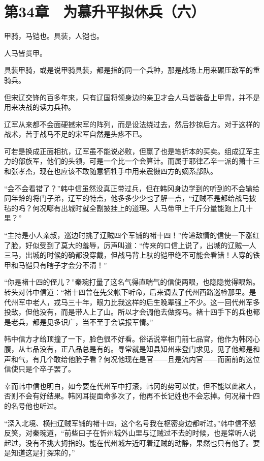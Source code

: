 \section{第34章　为慕升平拟休兵（六）}

甲骑，马铠也。具装，人铠也。

人马皆贯甲。

具装甲骑，或是说甲骑具装，都是指的同一个兵种，那是战场上用来碾压敌军的重骑兵。

但宋辽交锋的百多年来，只有辽国将领身边的亲卫才会人马皆装备上甲胄，并不是用来决战的读力兵种。

辽军从来都不会面硬撼宋军的阵列，而是设法绕过去，然后抄掠后方。对于这样的战术，苦于战马不足的宋军自然是头疼不已。

可若是换成正面相抗，辽军虽不能说必败，但赢了也是笔折本的买卖。组成辽军主力的部族军，他们的头领，可是一个比一个会算计。而属于耶律乙辛一派的萧十三和张孝杰，现在也应该不敢随意牺牲手中用来震慑四方的嫡系部队。

“会不会看错了？”韩中信虽然没真正带过兵，但在韩冈身边学到的听到的不会输给同年龄的将门子弟，辽军的特点，他多多少少也了解一点，“辽贼不是都给战马披毡的吗？何况哪有出城时就全副披挂上的道理。人马带甲上千斤分量能跑上几十里？”

“主持是小人亲叔，巡边时挑了辽贼四个军铺的褚十四！”传递敌情的信使一下涨红了脸，好似受到了莫大的羞辱，厉声叫道：“传来的口信上说了，出城的辽贼一人三马，出城的时候的确都没穿戴，但战马背上驮的铠甲绝不可能会看错！人穿的铁甲和马铠只有瞎子才会分不清！”

“你是褚十四的侄儿？”秦琬打量了这名气得直喘气的信使两眼，也隐隐觉得眼熟。转头对韩中信道：“褚十四曾在先父帐下听命，后来调去了代州西路巡检那里。是代州军中老人，戎马三十年，眼力比我这样的后生晚辈强上不少。这一回代州军多投敌，但他没有，而是带人上了山。所以才会调他去做探马。褚十四手下的兵也都是老兵，都是见多识广，当不至于会误报军情。”

韩中信方才给顶撞了一下，脸色很不好看。俗话说宰相门前七品官，他作为韩冈心腹，从七品没有，正八品总是有的。寻常就是知县知州来登门求见，见了他都是和声和气，有几个敢给他脸子看？何况他现在是官——且是流内官——而面前的这位信使只是个卒子罢了。

幸而韩中信也明白，如今要在代州军中打滚，韩冈的势可以仗，但不能以此欺人，否则不会有好结果。韩冈耳提面命多次了，他再不长记姓也不会忘掉。何况褚十四的名号他也听过。

“深入北境、横扫辽贼军铺的褚十四，这个名号我在枢密身边都听过。”韩中信不怒反笑，对秦琬道，“前些曰子在忻州城外山里与辽贼过不去的时候，也是常听人说起过，没有不挑大拇指的。能在代州城左近盯着辽贼的动静，果然也只有他了。要是知道这是打探来的，”

